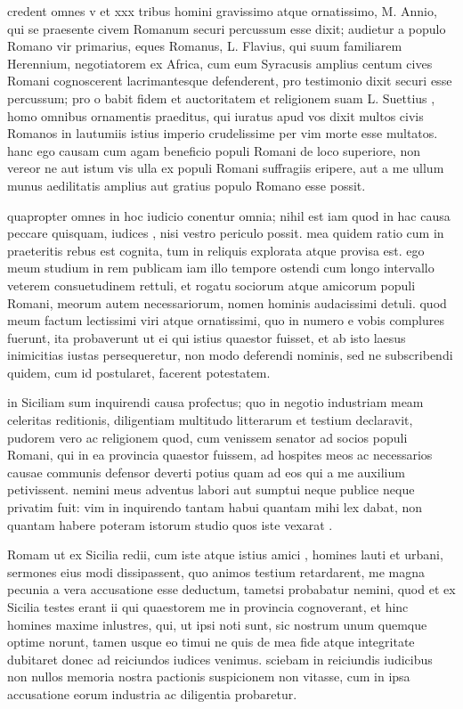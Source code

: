  credent omnes v et xxx tribus homini gravissimo atque ornatissimo, M. Annio, qui se praesente civem Romanum securi percussum esse dixit; audietur a populo Romano vir primarius, eques Romanus, L. Flavius, qui suum familiarem Herennium, negotiatorem ex Africa, cum eum Syracusis amplius centum cives Romani cognoscerent lacrimantesque defenderent, pro testimonio dixit securi esse percussum; pro o babit fidem et auctoritatem et religionem suam L. Suettius , homo omnibus ornamentis praeditus, qui iuratus apud vos dixit multos civis Romanos in lautumiis istius imperio crudelissime per vim morte esse multatos. hanc ego causam cum agam beneficio populi Romani de loco superiore, non vereor ne aut istum vis ulla ex populi Romani suffragiis eripere, aut a me ullum munus aedilitatis amplius aut gratius populo Romano esse possit.

 quapropter omnes in hoc iudicio conentur omnia; nihil est iam quod in hac causa peccare quisquam, iudices , nisi vestro periculo possit. mea quidem ratio cum in praeteritis rebus est cognita, tum in reliquis explorata atque provisa est. ego meum studium in rem publicam iam illo tempore ostendi cum longo intervallo veterem consuetudinem rettuli, et rogatu sociorum atque amicorum populi Romani, meorum autem necessariorum, nomen hominis audacissimi detuli. quod meum factum lectissimi viri atque ornatissimi, quo in numero e vobis complures fuerunt, ita probaverunt ut ei qui istius quaestor fuisset, et ab isto laesus inimicitias iustas persequeretur, non modo deferendi nominis, sed ne subscribendi quidem, cum id postularet, facerent potestatem.

 in Siciliam sum inquirendi causa profectus; quo in negotio industriam meam celeritas reditionis, diligentiam multitudo litterarum et testium declaravit, pudorem vero ac religionem quod, cum venissem senator ad socios populi Romani, qui in ea provincia quaestor fuissem, ad hospites meos ac necessarios causae communis defensor deverti potius quam ad eos qui a me auxilium petivissent. nemini meus adventus labori aut sumptui neque publice neque privatim fuit: vim in inquirendo tantam habui quantam mihi lex dabat, non quantam habere poteram istorum studio quos iste vexarat .

 Romam ut ex Sicilia redii, cum iste atque istius amici , homines lauti et urbani, sermones eius modi dissipassent, quo animos testium retardarent, me magna pecunia a vera accusatione esse deductum, tametsi probabatur nemini, quod et ex Sicilia testes erant ii qui quaestorem me in provincia cognoverant, et hinc homines maxime inlustres, qui, ut ipsi noti sunt, sic nostrum unum quemque optime norunt, tamen usque eo timui ne quis de mea fide atque integritate dubitaret donec ad reiciundos iudices venimus. sciebam in reiciundis iudicibus non nullos memoria nostra pactionis suspicionem non vitasse, cum in ipsa accusatione eorum industria ac diligentia probaretur.


